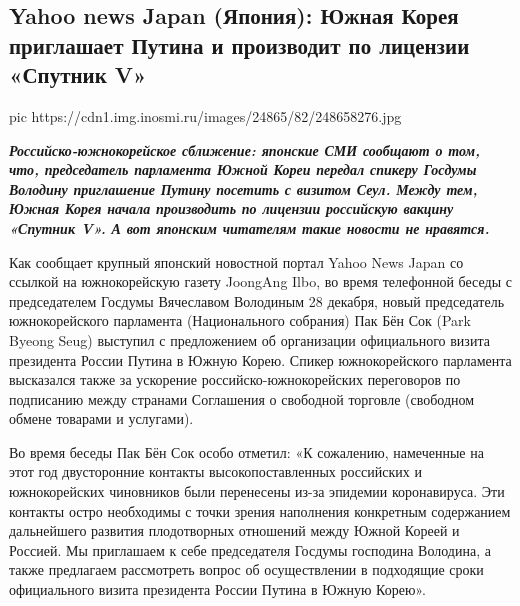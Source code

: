  
 
 
 
 
 
\subsection{Yahoo news Japan (Япония): Южная Корея приглашает Путина и производит по лицензии «Спутник V»}
\label{sec:29_12_2020.news.ru.inosmi.1.korea_sputnik_v_japan}

\ifcmt
  pic https://cdn1.img.inosmi.ru/images/24865/82/248658276.jpg
\fi


\begin{leftbar}
  \begingroup
    \em\Large\bfseries\color{blue}
Российско-южнокорейское сближение: японские СМИ сообщают о том, что,
председатель парламента Южной Кореи передал спикеру Госдумы Володину
приглашение Путину посетить с визитом Сеул. Между тем, Южная Корея начала
производить по лицензии российскую вакцину «Спутник V». А вот японским
читателям такие новости не нравятся.
  \endgroup
\end{leftbar}

Как сообщает крупный японский новостной портал Yahoo News Japan со ссылкой на
южнокорейскую газету JoongAng Ilbo, во время телефонной беседы с председателем
Госдумы Вячеславом Володиным 28 декабря, новый председатель южнокорейского
парламента (Национального собрания) Пак Бён Сок (Park Byeong Seug) выступил с
предложением об организации официального визита президента России Путина в
Южную Корею. Спикер южнокорейского парламента высказался также за ускорение
российско-южнокорейских переговоров по подписанию между странами Соглашения о
свободной торговле (свободном обмене товарами и услугами).

Во время беседы Пак Бён Сок особо отметил: «К сожалению, намеченные на этот год
двусторонние контакты высокопоставленных российских и южнокорейских чиновников
были перенесены из-за эпидемии коронавируса. Эти контакты остро необходимы с
точки зрения наполнения конкретным содержанием дальнейшего развития
плодотворных отношений между Южной Кореей и Россией. Мы приглашаем к себе
председателя Госдумы господина Володина, а также предлагаем рассмотреть вопрос
об осуществлении в подходящие сроки официального визита президента России
Путина в Южную Корею».

